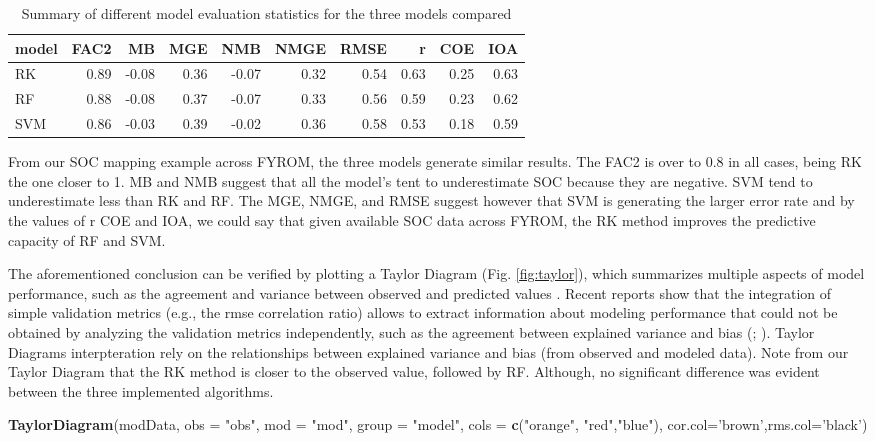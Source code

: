 \documentclass[10pt,b5paper,]{book}
\newenvironment{Shaded}{\begin{snugshade}}{\end{snugshade}}
\newcommand{\DataTypeTok}[1]{\textcolor[rgb]{0.13,0.29,0.53}{#1}}
\newcommand{\KeywordTok}[1]{\textcolor[rgb]{0.13,0.29,0.53}{\textbf{#1}}}
\newcommand{\NormalTok}[1]{#1}
\newcommand{\StringTok}[1]{\textcolor[rgb]{0.31,0.60,0.02}{#1}}
\theoremstyle{definition}
\theoremstyle{definition}
\theoremstyle{definition}
\theoremstyle{remark}
\begin{document}
\begin{table}

\caption{\label{tab:modsts}Summary of different model evaluation statistics for the three models compared}
\centering
\begin{tabular}[t]{lrrrrrrrrr}
\toprule
model & FAC2 & MB & MGE & NMB & NMGE & RMSE & r & COE & IOA\\
\midrule
RK & 0.89 & -0.08 & 0.36 & -0.07 & 0.32 & 0.54 & 0.63 & 0.25 & 0.63\\
RF & 0.88 & -0.08 & 0.37 & -0.07 & 0.33 & 0.56 & 0.59 & 0.23 & 0.62\\
SVM & 0.86 & -0.03 & 0.39 & -0.02 & 0.36 & 0.58 & 0.53 & 0.18 & 0.59\\
\bottomrule
\end{tabular}
\end{table}

From our SOC mapping example across FYROM, the three models generate
similar results. The FAC2 is over to 0.8 in all cases, being RK the one
closer to 1. MB and NMB suggest that all the model's tent to
underestimate SOC because they are negative. SVM tend to underestimate
less than RK and RF. The MGE, NMGE, and RMSE suggest however that SVM is
generating the larger error rate and by the values of r COE and IOA, we
could say that given available SOC data across FYROM, the RK method
improves the predictive capacity of RF and SVM.

The aforementioned conclusion can be verified by plotting a Taylor
Diagram (Fig. \ref{fig:taylor}), which summarizes multiple aspects of
model performance, such as the agreement and variance between observed
and predicted values \citep{taylor2001summarizing}. Recent reports show
that the integration of simple validation metrics (e.g., the rmse
correlation ratio) allows to extract information about modeling
performance that could not be obtained by analyzing the validation
metrics independently, such as the agreement between explained variance
and bias (\citet{soil-2017-40}; \citet{nussbaum2018evaluation}). Taylor
Diagrams interpteration rely on the relationships between explained
variance and bias (from observed and modeled data). Note from our Taylor
Diagram that the RK method is closer to the observed value, followed by
RF. Although, no significant difference was evident between the three
implemented algorithms.

\begin{Shaded}
\begin{Highlighting}[]
\KeywordTok{TaylorDiagram}\NormalTok{(modData, }\DataTypeTok{obs =} \StringTok{"obs"}\NormalTok{, }\DataTypeTok{mod =} \StringTok{"mod"}\NormalTok{, }\DataTypeTok{group =} \StringTok{"model"}\NormalTok{,}
\DataTypeTok{cols =} \KeywordTok{c}\NormalTok{(}\StringTok{"orange"}\NormalTok{, }\StringTok{"red"}\NormalTok{,}\StringTok{"blue"}\NormalTok{), }\DataTypeTok{cor.col=}\StringTok{'brown'}\NormalTok{,}\DataTypeTok{rms.col=}\StringTok{'black'}\NormalTok{)}
\end{Highlighting}
\end{Shaded}
\end{document}

